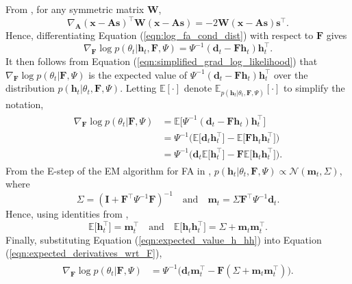 \documentclass[msc,deptreport.inf]{infthesis} %
\newcommand{\matr}[1]{\mathbf{#1}}
\newcommand{\E}{\mathbb E}
\begin{document}
From \cite{petersen2012}, for any symmetric matrix $\matr{W}$,
\begin{equation}
	\nabla_{\matr{A}} (\matr{x} - \matr{As})^\intercal \matr{W} (\matr{x} - \matr{As}) = -2 \matr{W} (\matr{x} - \matr{As}) \matr{s}^\intercal.
\end{equation}
Hence, differentiating Equation (\ref{eqn:log_fa_cond_dist}) with respect to $\matr{F}$ gives
\begin{equation}
	\nabla_{\matr{F}} \log p(\theta_t | \matr{h}_t, \matr{F}, \Psi)
	= \Psi^{-1} (\matr{d}_t - \matr{Fh}_t) \matr{h}_t^\intercal.
\end{equation}
It then follows from Equation (\ref{eqn:simplified_grad_log_likelihood}) that $\nabla_{\matr{F}} \log p(\theta_t | \matr{F}, \Psi)$ is the expected value of $\Psi^{-1} (\matr{d}_t - \matr{Fh}_t) \matr{h}_t^\intercal$ over the distribution $p(\matr{h}_t | \theta_t, \matr{F}, \Psi)$. Letting $\E[\cdot]$ denote $\E_{p(\matr{h}_t | \theta_t, \matr{F}, \Psi)}[\cdot]$ to simplify the notation, 
\begin{align}\label{eqn:expected_derivatives_wrt_F}
\begin{split}
	\nabla_{\matr{F}} \log p(\theta_t | \matr{F}, \Psi) 
	& = \E \big[ \Psi^{-1} (\matr{d}_t - \matr{Fh}_t) \matr{h}_t^\intercal \big] \\
	& = \Psi^{-1} \big(\E \big[ \matr{d}_t \matr{h}_t^\intercal \big] 
	- \E \big[ \matr{Fh}_t \matr{h}_t^\intercal \big] \big) \\
	& = \Psi^{-1}\big( \matr{d}_t \E \big[ \matr{h}_t^\intercal \big] 
	- \matr{F}  \E \big[ \matr{h}_t \matr{h}_t^\intercal \big]\big).
\end{split}
\end{align} 
From the E-step of the EM algorithm for FA in \cite{barber2007}, $p(\matr{h}_t | \theta_t, \matr{F}, \Psi) \propto \mathcal{N}(\matr{m}_t, \Sigma)$, where
\begin{equation}\label{eqn:variational_params}
	\Sigma = (\matr{I} + \matr{F}^\intercal \Psi^{-1} \matr{F})^{-1}
	\quad \text{and} \quad \matr{m}_t = \Sigma \matr{F}^\intercal \Psi^{-1} \matr{d}_t.
\end{equation}
Hence, using identities from \cite{petersen2012}, 
\begin{equation}\label{eqn:expected_value_h_hh}
	\E \big[ \matr{h}_t^\intercal \big] = \matr{m}_t^\intercal \quad \text{and} \quad \E \big[ \matr{h}_t \matr{h}_t^\intercal \big] = \Sigma + \matr{m}_t \matr{m}_t^\intercal.
\end{equation}
Finally, substituting Equation (\ref{eqn:expected_value_h_hh}) into Equation (\ref{eqn:expected_derivatives_wrt_F}), 
\begin{align}\label{eqn:derivatives_wrt_F}
\begin{split}
	\nabla_{\matr{F}} \log p(\theta_t | \matr{F}, \Psi) 
	& = \Psi^{-1} \big(\matr{d}_t \matr{m}_t^\intercal - \matr{F}  (\Sigma + \matr{m}_t \matr{m}_t^\intercal)\big).
\end{split}
\end{align} 
\end{document}
